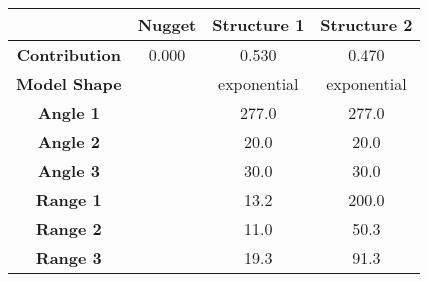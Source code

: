\begin{tabular}{cccc}
\toprule
{} & Nugget &  Structure 1 &  Structure 2 \\
\midrule
\textbf{Contribution} &  0.000 &        0.530 &        0.470 \\
\textbf{Model Shape } &        &  exponential &  exponential \\
\textbf{Angle 1     } &        &        277.0 &        277.0 \\
\textbf{Angle 2     } &        &         20.0 &         20.0 \\
\textbf{Angle 3     } &        &         30.0 &         30.0 \\
\textbf{Range 1     } &        &         13.2 &        200.0 \\
\textbf{Range 2     } &        &         11.0 &         50.3 \\
\textbf{Range 3     } &        &         19.3 &         91.3 \\
\bottomrule
\end{tabular}
